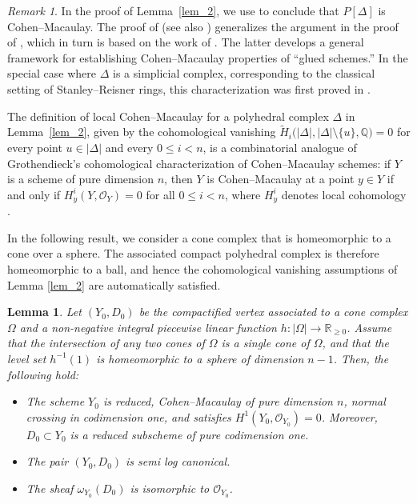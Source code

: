 \documentclass[12pt,letterpaper, reqno]{amsart}
\newtheorem{lemma}[theorem]{Lemma}
\theoremstyle{defstyle} \newtheorem{definition}[theorem]{Definition}
\theoremstyle{remark}
\newtheorem{remark}[theorem]{Remark}
\numberwithin{equation}{section}
\numberwithin{figure}{section}
\newcommand{\cO} {\mathcal{O}}
\newcommand{\QQ} {\mathbb{Q}}
\newcommand{\RR} {\mathbb{R}}
\begin{document}
\begin{remark}
In the proof of Lemma~\ref{lem_2}, we use \cite[Lemma~2.4.12]{Valeryannals} to conclude that $P[\Delta]$ is Cohen--Macaulay. The proof of \cite[Lemma~2.4.12]{Valeryannals} (see also \cite[Theorem~2.3.19]{Valeryannals}) generalizes the argument in the proof of \cite[\S4.6]{stanley1987generalized}, which in turn is based on the work of \cite{yuzvinsky1987cohen}. The latter develops a general framework for establishing Cohen--Macaulay properties of ``glued schemes.'' In the special case where $\Delta$ is a simplicial complex, corresponding to the classical setting of Stanley--Reisner rings, this characterization was first proved in \cite[Theorem~1]{reisner1976cohen}.

The definition of local Cohen--Macaulay for a polyhedral complex $\Delta$ in Lemma~\ref{lem_2}, 
given by the cohomological vanishing
$\widetilde{H}_i\bigl(|\Delta|,|\Delta|\setminus\{u\},\QQ\bigr)=0$
for every point $u\in |\Delta|$ and every $0\le i<n$, is a combinatorial analogue of Grothendieck's cohomological characterization of Cohen--Macaulay schemes: 
if $Y$ is a scheme of pure dimension $n$, then $Y$ is Cohen--Macaulay at a point $y\in Y$ if and only if
$H^i_y(Y,\mathcal{O}_Y)=0$
for all $0\le i<n$, where $H^i_y$ denotes local cohomology \cite[Theorem~3.8]{Hartshorne1967local}.
\end{remark}


In the following result, we consider a cone complex that is homeomorphic to a cone over a sphere. The associated compact polyhedral complex is therefore homeomorphic to a ball, and hence the cohomological vanishing assumptions of Lemma \ref{lem_2} are automatically satisfied.


\begin{lemma} \label{lem_comp_vertex}
 Let $(Y_0,D_0)$ be the compactified vertex associated to a cone complex $\Omega$ and a non-negative integral piecewise linear function $h: |\Omega| \rightarrow \RR_{\geq 0}$. Assume that the intersection of any two cones of $\Omega$ is a single cone of $\Omega$, and that the level set $h^{-1}(1)$ is homeomorphic to a sphere of dimension $n-1$. 
Then, the following hold:
\begin{itemize}
    \item[(i)] The scheme $Y_0$ is reduced, Cohen--Macaulay of pure dimension $n$, normal crossing in codimension one, and satisfies $H^1(Y_0, \cO_{Y_0})=0$. Moreover, $D_0 \subset Y_0$ is a reduced subscheme of pure codimension one. 
    \item[(ii)] The pair $(Y_0, D_0)$ is semi log canonical.
    \item[(iii)] The sheaf $\omega_{Y_0}(D_0)$ is isomorphic to $\cO_{Y_0}$.
\end{itemize}
\end{lemma}
\end{document}
